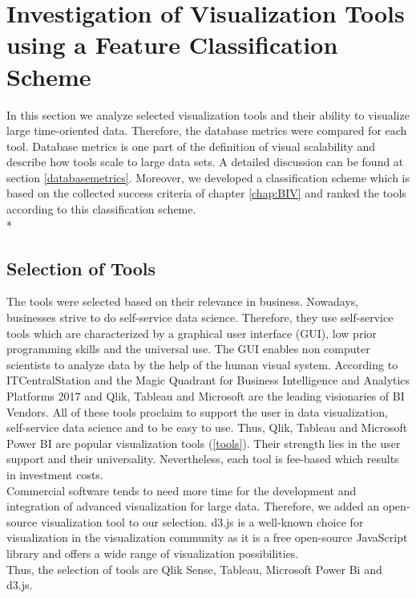 \chapter{Investigation of Visualization Tools using a Feature Classification Scheme}
\label{chap:Tools}

In this section we analyze selected visualization tools and their ability to visualize large time-oriented data. Therefore, the database metrics were compared for each tool. Database metrics is one part of the definition of visual scalability and describe how tools scale to large data sets. A detailed discussion can be found at section \ref{databasemetrics}. Moreover, we developed a classification scheme which is based on the collected success criteria of chapter \ref{chap:BIV} and ranked the tools according to this classification scheme. \\*

\section{Selection of Tools}\label{tool:selection}
The tools were selected based on their relevance in business. Nowadays, businesses strive to do self-service data science\cite{Russom2011,Parenteau2016,visualization2012making,curran2005self}. Therefore, they use self-service tools which are characterized by a graphical user interface (GUI), low prior programming skills and the universal use. The GUI enables non computer scientists to analyze data by the help of the human visual system. According to ITCentralStation and the Magic Quadrant for Business Intelligence and Analytics Platforms 2017 \cite{ITCentralStation, Sallam2017} and  Qlik, Tableau and Microsoft are the leading visionaries of BI Vendors. All of these tools proclaim to support the user in data visualization, self-service data science and to be easy to use. Thus, Qlik, Tableau and Microsoft Power BI are popular visualization tools (\ref{tools}). Their strength lies in the user support and their universality. Nevertheless, each tool is fee-based which results in investment costs. \\
Commercial software tends to need more time for the development and integration of advanced visualization for large data\cite{Zhanga, Simon2014}. Therefore, we added an open-source visualization tool to our selection. d3.js is a well-known choice for visualization in the visualization community as it is a free open-source JavaScript library and offers a wide range of visualization possibilities. \\
Thus, the selection of tools are Qlik Sense, Tableau, Microsoft Power Bi and d3.js.

